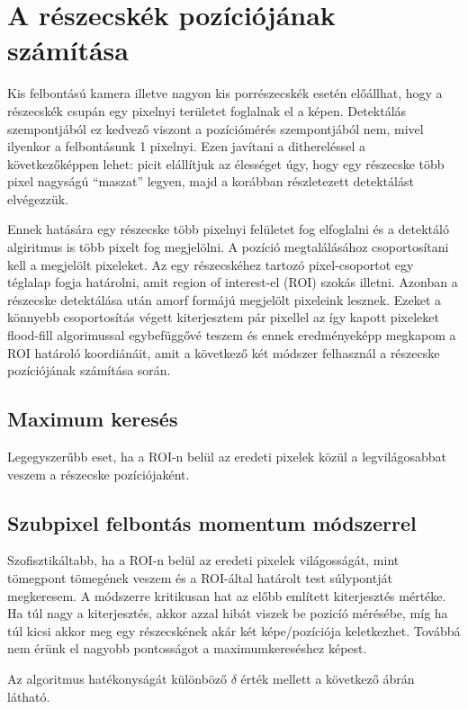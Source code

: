\section{A részecskék pozíciójának számítása}
	Kis felbontású kamera illetve nagyon kis porrészecskék esetén előállhat, hogy a részecskék csupán egy
	pixelnyi területet foglalnak el a képen. Detektálás szempontjából ez kedvező viszont a pozíciómérés
	szempontjából nem, mivel ilyenkor a felbontásunk 1 pixelnyi. Ezen javítani a dithereléssel a
	következőképpen lehet: picit elállítjuk az élességet úgy, hogy egy részecske több pixel nagyságú
	``maszat'' legyen, majd a korábban részletezett detektálást elvégezzük.
	
	Ennek hatására egy részecske több pixelnyi felületet fog elfoglalni és a detektáló algiritmus is
	több pixelt fog megjelölni. A pozíció megtalálásához csoportosítani kell a megjelölt pixeleket.
	Az egy részecskéhez tartozó pixel-csoportot egy téglalap fogja határolni, amit region of
	interest-el (ROI) szokás illetni. Azonban a részecske detektálása után amorf formájú megjelölt
	pixeleink lesznek. Ezeket a könnyebb csoportosítás végett kiterjesztem pár pixellel az így kapott
	pixeleket flood-fill algorimussal egybefüggővé teszem és ennek eredményeképp megkapom a ROI határoló
	koordiánáit, amit a következő két módszer felhasznál a részecske pozíciójának számítása során.
	\subsection*{Maximum keresés}
	Legegyszerűbb eset, ha a ROI-n belül az eredeti pixelek közül a legvilágosabbat veszem a
	részecske pozíciójaként.
	\subsection*{Szubpixel felbontás momentum módszerrel}
	Szofisztikáltabb, ha a ROI-n belül az eredeti pixelek világosságát, mint tömegpont tömegének veszem
	és a ROI-által határolt test súlypontját megkeresem. A módszerre kritikusan hat az előbb említett
	kiterjesztés mértéke. Ha túl nagy a kiterjesztés, akkor azzal hibát viszek be pozicíó mérésébe,
	míg ha túl kicsi akkor meg egy részecskének akár két képe/pozíciója keletkezhet. Továbbá nem érünk el nagyobb pontosságot a
	maximumkereséshez képest.
	
	\noindent Az algoritmus hatékonyságát különböző $\delta$ érték mellett a következő 
	ábrán látható.
	
